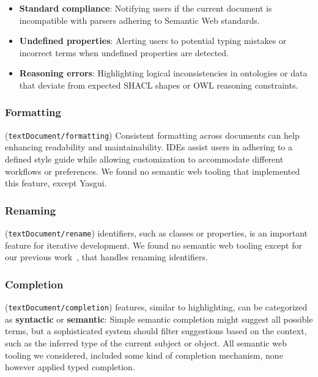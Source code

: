 \begin{itemize}
    \item \textbf{Standard compliance}: Notifying users if the current document is incompatible with parsers adhering to Semantic Web standards.
    \item \textbf{Undefined properties}: Alerting users to potential typing mistakes or incorrect terms when undefined properties are detected.
    \item \textbf{Reasoning errors}: Highlighting logical inconsistencies in ontologies or data that deviate from expected SHACL shapes or OWL reasoning constraints.
\end{itemize}


\subsubsection{Formatting} (\texttt{textDocument/formatting})
Consistent formatting across documents can help enhancing readability and maintainability.
IDEs assist users in adhering to a defined style guide while allowing customization to accommodate different workflows or preferences.
We found no semantic web tooling that implemented this feature, except Yasgui.

\subsubsection{Renaming} (\texttt{textDocument/rename}) identifiers, such as classes or properties, is an important feature for iterative development.
We found no semantic web tooling except for our previous work~\cite{JSONLD-LSP}, that handles renaming identifiers.

\subsubsection{Completion} (\texttt{textDocument/completion}) features, similar to highlighting, can be categorized as \textbf{syntactic} or \textbf{semantic}:
Simple semantic completion might suggest all possible terms, but a sophisticated system should filter suggestions based on the context, such as the inferred type of the current subject or object.
All semantic web tooling we considered, included some kind of completion mechanism, none however applied typed completion.


